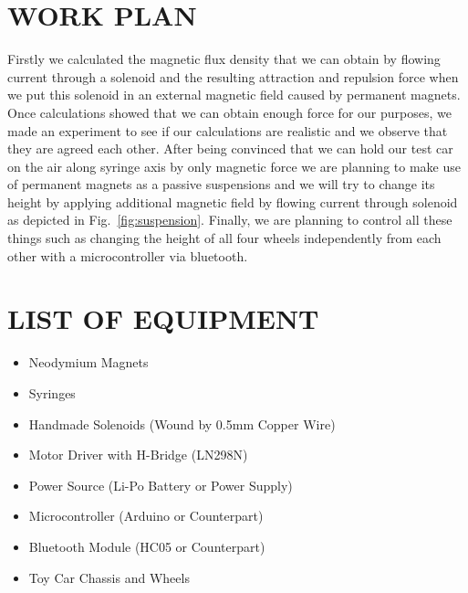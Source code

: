 \documentclass[a4paper, 12pt]{IEEEtran}
\begin{document}
\section{WORK PLAN}
Firstly we calculated the magnetic flux density that we can obtain by flowing current through a solenoid and the resulting attraction and repulsion force when we put this solenoid in an external magnetic field caused by permanent magnets. Once calculations showed that we can obtain enough force for our purposes, we made an experiment to see if our calculations are realistic and we observe that they are agreed each other. After being convinced that we can hold our test car on the air along syringe axis by only magnetic force we are planning to make use of permanent magnets as a passive suspensions and we will try to change its height by applying additional magnetic field by flowing current through solenoid as depicted in Fig.~\ref{fig:suspension}. Finally, we are planning to control all these things such as changing the height of all four wheels independently from each other with a microcontroller via bluetooth.


\section{LIST OF EQUIPMENT}

\begin{itemize}
    \item Neodymium Magnets
    \item Syringes
    \item Handmade Solenoids (Wound by 0.5mm Copper Wire)
    \item Motor Driver with H-Bridge (LN298N)
    \item Power Source (Li-Po Battery or Power Supply)
    \item Microcontroller (Arduino or Counterpart)
    \item Bluetooth Module (HC05 or Counterpart)
    \item Toy Car Chassis and Wheels
\end{itemize}

\printbibliography{}
\end{document}
